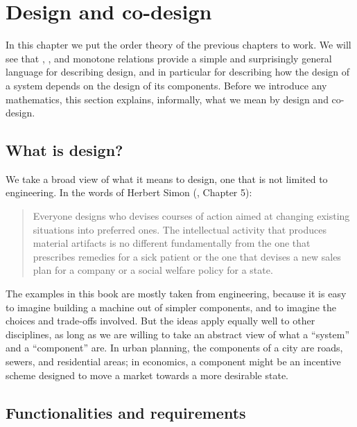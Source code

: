 
\section{Design and co-design}
\label{sec:intro-design}

In this chapter we put the order theory of the previous chapters to work.
We will see that , , and monotone relations provide a simple and surprisingly general language for describing design, and in particular for describing how the design of a system depends on the design of its components.
Before we introduce any mathematics, this section explains, informally, what we mean by design and co-design.

\subsection{What is design?}

We take a broad view of what it means to design, one that is not limited to engineering.
In the words of Herbert Simon (\cite{hebert96sciences}, Chapter 5):

\begin{quote}
    Everyone designs who devises courses of action aimed at changing existing situations into preferred ones.
    The intellectual activity that produces material artifacts is no different fundamentally from the one that prescribes remedies for a sick patient or the one that devises a new sales plan for a company or a social welfare policy for a state.
\end{quote}

The examples in this book are mostly taken from engineering, because it is easy to imagine building a machine out of simpler components, and to imagine the choices and trade-offs involved.
But the ideas apply equally well to other disciplines, as long as we are willing to take an abstract view of what a ``system'' and a ``component'' are.
In urban planning, the components of a city are roads, sewers, and residential areas; in economics, a component might be an incentive scheme designed to move a market towards a more desirable state.

\subsection{Functionalities and requirements}

